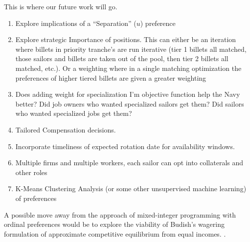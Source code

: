 This is where our future work will go.

\begin{enumerate}

\item Explore implications of a ``Separation'' ($u$) preference

\item Explore strategic Importance of positions. This can either be an iteration where billets in priority tranche's are run iterative (tier 1 billets all matched, those sailors and billets are taken out of the pool, then tier 2 billets all matched, etc.). Or a weighting where in a single matching optimization the preferences of higher tiered billets are given a greater weighting

\item Does adding weight for specialization I’m objective function help the Navy better? Did job owners who wanted specialized sailors get them? Did sailors who wanted specialized jobs get them?

\item Tailored Compensation decisions. 

\item Incorporate timeliness of expected rotation date for availability windows.

\item Multiple firms and multiple workers, each sailor can opt into collaterals and other roles \cite{1982_Roth}

\item K-Means Clustering Analysis (or some other unsupervised machine learning) of preferences  

\end{enumerate}

A possible move away from the approach of mixed-integer programming with ordinal preferences would be to explore the viability of Budish's wagering formulation of approximate competitive equilibrium from equal incomes. \cite{2011_Budish}.